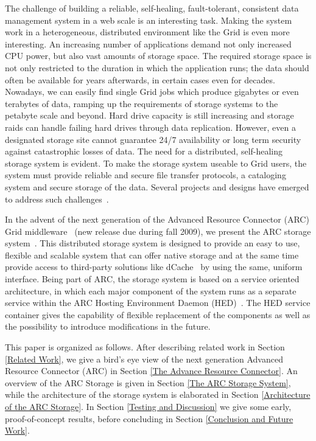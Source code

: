 \documentclass[final]{ieee}
\begin{document}
The challenge of building a reliable, self-healing, fault-tolerant,
consistent data management system in a web scale is an interesting
task. Making the system work in a heterogeneous, distributed
environment like the Grid is even more interesting. An increasing
number of applications demand not only increased CPU power, but also
vast amounts of storage space. The required storage space is not only
restricted to the duration in which the application runs; the data
should often be available for years afterwards, in certain cases even
for decades. Nowadays, we can easily find single Grid jobs which produce
gigabytes or even terabytes of data, ramping up the requirements of
storage systems to the petabyte scale and beyond. Hard drive capacity is
still increasing and storage raids can handle failing hard drives through 
data replication. However, even a designated storage site cannot guarantee 
24/7 availability or long term security against catastrophic losses of data. 
The need for a distributed, self-healing storage system is evident. To
make the storage system useable to Grid users, the system must provide
reliable and secure file transfer protocols, a cataloging system and
secure storage of the data. Several projects and designs have emerged
to address such challenges~\cite{Hoschek00datamanagement,DengWang}.

In the advent of the next generation of the Advanced Resource Connector (ARC)
Grid middleware~\cite{arc} (new release due during fall 2009), we present 
the ARC storage system~\cite{ARCStoragedesigndoc}. This distributed
storage system is designed to provide an easy
to use, flexible and scalable system that can offer native storage and
at the same time provide access to third-party solutions like
dCache~\cite{dCache,DSSWithdCache}  by
using the same, uniform interface. Being part of ARC, the
storage system is based on a service
oriented architecture, in which each major component of the
system runs as a separate service within the ARC Hosting Environment
Daemon (HED)~\cite{HEDdesigndoc}. The HED service container gives the
capability of flexible replacement of the components as well as the
possibility to introduce modifications in the future. %

This paper is organized as follows. After describing
related work in Section \ref{Related Work}, we give a bird's eye
view of the next generation Advanced Resource Connector (ARC) in
Section \ref{The Advance Resource Connector}. An overview of the
ARC Storage is given in Section \ref{The ARC Storage System}, while
the architecture of the storage system is elaborated in Section
\ref{Architecture of the ARC Storage}. In Section \ref{Testing and
  Discussion} we give some early, proof-of-concept results, before 
concluding in Section \ref{Conclusion and Future Work}. 
\end{document}
